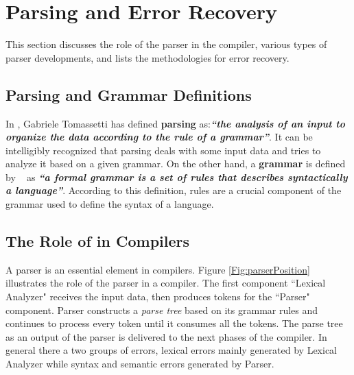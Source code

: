 \section{Parsing and Error Recovery}
\label{sec:bck_parser}
This section discusses the role of the parser in the compiler, various types of parser developments, and lists the methodologies for error recovery. 

\subsection{Parsing and Grammar Definitions}

In \cite{parsingGuide2017}, Gabriele Tomassetti has defined \textbf{parsing} as:{\it  \textbf{``the analysis of an input to organize the data according to the rule of a grammar''}}. It can be intelligibly recognized that parsing deals with some input data and tries to analyze it based on a given grammar. 
On the other hand, a \textbf{grammar} is defined by ~\cite{parsingGuide2017} as {\it \textbf{``a formal grammar is a set of rules that describes syntactically a language''}}. 
According to this definition, rules are a crucial component of the grammar used to define the syntax of a language.

\subsection{The Role of in Compilers}
A parser is an essential element in  compilers. 
{Figure \ref{Fig:parserPosition}} illustrates the role of the parser in a compiler. 
The first component ``Lexical Analyzer" receives the input data, then produces tokens for the ``Parser" component. Parser constructs a \emph{parse tree} based on its grammar rules and continues to process every token until it consumes all the tokens. 
The parse tree as an output of the parser is delivered to the next phases of the compiler. 
In general there a two groups of errors, lexical errors mainly generated by Lexical Analyzer while syntax and semantic errors generated by Parser.

